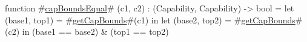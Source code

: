 function #\hyperref[sailRISCVzcapBoundsEqual]{capBoundsEqual}# (c1, c2) : (Capability, Capability) -> bool =
    let (base1, top1) = #\hyperref[sailRISCVzgetCapBounds]{getCapBounds}#(c1) in
    let (base2, top2) = #\hyperref[sailRISCVzgetCapBounds]{getCapBounds}#(c2) in
    (base1 == base2) & (top1 == top2)
